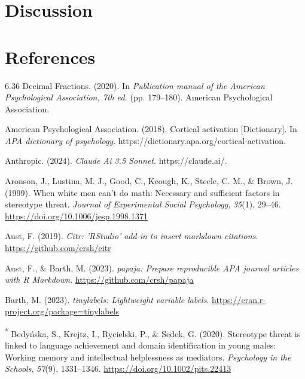 \documentclass[
  stu,floatsintext]{apa7}
\newlength{\cslhangindent}
\newenvironment{CSLReferences}[2] %
 {\begin{list}{}{%
  \setlength{\itemindent}{0pt}
  \setlength{\leftmargin}{0pt}
  \setlength{\parsep}{0pt}
  \ifodd #1
   \setlength{\leftmargin}{\cslhangindent}
   \setlength{\itemindent}{-1\cslhangindent}
  \fi
  \setlength{\itemsep}{#2\baselineskip}}}
 {\end{list}}
\begin{document}
\section{Discussion}\label{discussion}

\newpage

\section{References}\label{references}

\label{refs}
\begin{CSLReferences}{1}{0}
6.36 {Decimal Fractions}. (2020). In \emph{Publication manual of the {American Psychological Association}, 7th ed.} (pp. 179--180). American Psychological Association.

American Psychological Association. (2018). Cortical activation {[}Dictionary{]}. In \emph{APA dictionary of psychology}. https://dictionary.apa.org/cortical-activation.

Anthropic. (2024). \emph{Claude {Ai} 3.5 {Sonnet}}. https://claude.ai/.

Aronson, J., Lustina, M. J., Good, C., Keough, K., Steele, C. M., \& Brown, J. (1999). When white men can't do math: {Necessary} and sufficient factors in stereotype threat. \emph{Journal of Experimental Social Psychology}, \emph{35}(1), 29--46. \url{https://doi.org/10.1006/jesp.1998.1371}

Aust, F. (2019). \emph{Citr: 'RStudio' add-in to insert markdown citations}. \url{https://github.com/crsh/citr}

Aust, F., \& Barth, M. (2023). \emph{{papaja}: {Prepare} reproducible {APA} journal articles with {R Markdown}}. \url{https://github.com/crsh/papaja}

Barth, M. (2023). \emph{{tinylabels}: Lightweight variable labels}. \url{https://cran.r-project.org/package=tinylabels}

\textsuperscript{*} Bedyńska, S., Krejtz, I., Rycielski, P., \& Sedek, G. (2020). Stereotype threat is linked to language achievement and domain identification in young males: {Working} memory and intellectual helplessness as mediators. \emph{Psychology in the Schools}, \emph{57}(9), 1331--1346. \url{https://doi.org/10.1002/pits.22413}


\end{CSLReferences}
\end{document}
